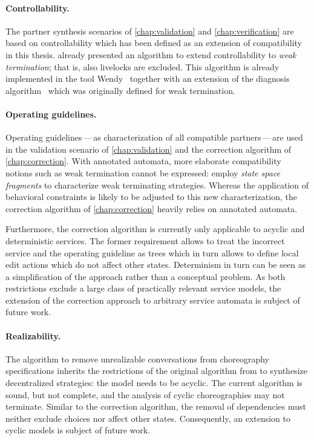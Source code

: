 \paragraph{Controllability.}

The partner synthesis scenarios of \autoref{chap:validation} and \autoref{chap:verification} are based on controllability which has been defined as an extension of compatibility in this thesis. \citet{Wolf_2008_topnoc} already presented an algorithm to extend controllability to \emph{weak termination}; that is, also livelocks are excluded. This algorithm is already implemented in the tool Wendy~\cite{LohmannW_2009_wendy} together with an extension of the diagnosis algorithm~\cite{Lohmann_2008_wsfm} which was originally defined for weak termination.


\paragraph{Operating guidelines.}

Operating guidelines\,---\,as characterization of all compatible partners\,---\,are used in the validation scenario of \autoref{chap:validation} and the correction algorithm of \autoref{chap:correction}. With annotated automata, more elaborate compatibility notions such as weak termination cannot be expressed: \citet{WolfSOD_2009_acsd} employ \emph{state space fragments} to characterize weak terminating strategies. Whereas the application of behavioral constraints is likely to be adjusted to this new characterization, the correction algorithm of \autoref{chap:correction} heavily relies on annotated automata.

Furthermore, the correction algorithm is currently only applicable to acyclic and deterministic services. The former requirement allows to treat the incorrect service and the operating guideline as trees which in turn allows to define local edit actions which do not affect other states. Determinism in turn can be seen as a simplification of the approach rather than a conceptual problem. As both restrictions exclude a large class of practically relevant service models, the extension of the correction approach to arbitrary service automata is subject of future work.


\paragraph{Realizability.}

The algorithm to remove unrealizable conversations from choreography specifications inherits the restrictions of the original algorithm from \citet{WolfSOD_2009_acsd} to synthesize decentralized strategies: the model needs to be acyclic. The current algorithm is sound, but not complete, and the analysis of cyclic choreographies may not terminate. Similar to the correction algorithm, the removal of dependencies must neither exclude choices nor affect other states. Consequently, an extension to cyclic models is subject of future work.

